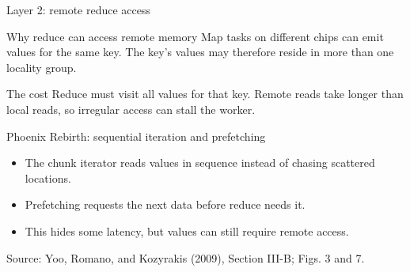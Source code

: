\documentclass[aspectratio=169,11pt]{beamer}
\newcommand{\src}[1]{\vfill{\tiny\color{gray}Source: Yoo, Romano, and Kozyrakis (2009), #1.}}
\begin{document}
\begin{frame}{Layer 2: remote reduce access}
\begin{block}{Why reduce can access remote memory}
Map tasks on different chips can emit values for the same key. The key's values may therefore reside in more than one locality group.
\end{block}
\begin{alertblock}{The cost}
Reduce must visit all values for that key. Remote reads take longer than local reads, so irregular access can stall the worker.
\end{alertblock}
\begin{block}{Phoenix Rebirth: sequential iteration and prefetching}
\begin{itemize}
\item The chunk iterator reads values in sequence instead of chasing scattered locations.
\item Prefetching requests the next data before reduce needs it.
\item This hides some latency, but values can still require remote access.
\end{itemize}
\end{block}
\src{Section III-B; Figs. 3 and 7}
\end{frame}
\end{document}
